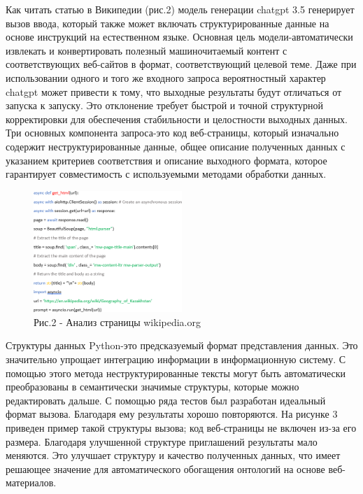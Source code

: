 \begin{multicols}{2}
Как читать статью в Википедии (рис.2) модель генерации chatgpt 3.5
генерирует вызов ввода, который также может включать структурированные
данные на основе инструкций на естественном языке. Основная цель
модели-автоматически извлекать и конвертировать полезный машиночитаемый
контент с соответствующих веб-сайтов в формат, соответствующий целевой
теме. Даже при использовании одного и того же входного запроса
вероятностный характер chatgpt может привести к тому, что выходные
результаты будут отличаться от запуска к запуску. Это отклонение требует
быстрой и точной структурной корректировки для обеспечения стабильности
и целостности выходных данных. Три основных компонента запроса-это код
веб-страницы, который изначально содержит неструктурированные данные,
общее описание полученных данных с указанием критериев соответствия и
описание выходного формата, которое гарантирует совместимость с
используемыми методами обработки данных.
\end{multicols}

\begin{figure}[H]
	\centering
	\includegraphics[width=0.5\textwidth]{media/ict2/image150}
	\caption*{Рис.2 - Анализ страницы wikipedia.org}
\end{figure}

\begin{multicols}{2}
Структуры данных Python-это предсказуемый формат представления данных.
Это значительно упрощает интеграцию информации в информационную систему.
С помощью этого метода неструктурированные тексты могут быть
автоматически преобразованы в семантически значимые структуры, которые
можно редактировать дальше. С помощью ряда тестов был разработан
идеальный формат вызова. Благодаря ему результаты хорошо повторяются. На
рисунке 3 приведен пример такой структуры вызова; код веб-страницы не
включен из-за его размера. Благодаря улучшенной структуре приглашений
результаты мало меняются. Это улучшает структуру и качество полученных
данных, что имеет решающее значение для автоматического обогащения
онтологий на основе веб-материалов.
\end{multicols}

